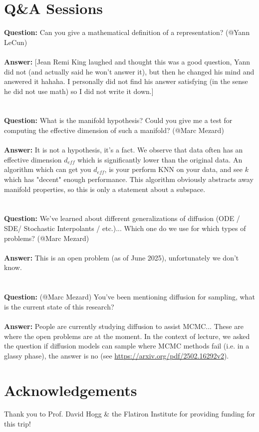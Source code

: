 \documentclass[12pt,fleqn]{book}
\numberwithin{equation}{section} %
\begin{document}
\section{Q\&A Sessions}
\textbf{Question:} Can you give a mathematical definition of a representation? (@Yann LeCun)
\\ \\ 
\textbf{Answer:} [Jean Remi King laughed and thought this was a good question, Yann did not (and actually said he won't answer it), but then he changed his mind and answered it hahaha. I personally did not find his answer satisfying (in the sense he did not use math) so I did not write it down.]
\\
\\
\\
\textbf{Question:} What is the manifold hypothesis? Could you give me a test for computing the effective dimension of such a manifold? (@Marc Mezard)
\\ \\
\textbf{Answer:} It is not a hypothesis, it's a fact. We observe that data often has an effective dimension $d_{eff}$ which is significantly lower than the original data. An algorithm which can get you $d_{eff}$, is your perform KNN on your data, and see $k$ which has "decent" enough performance. This algorithm obviously abstracts away manifold properties, so this is only a statement about a subspace. 
\\
\\
\\
\textbf{Question:} We've learned about different generalizations of diffusion (ODE / SDE/ Stochastic Interpolants / etc.)... Which one do we use for which types of problems? (@Marc Mezard)
\\ \\
\textbf{Answer:} This is an open problem (as of June 2025), unfortunately we don't know.
\\
\\
\\
\textbf{Question:} (@Marc Mezard) You've been mentioning diffusion for sampling, what is the current state of this research?
\\ \\ 
\textbf{Answer:} People are currently studying diffusion to assist MCMC... These are where the open problems are at the moment. In the context of lecture, we asked the question if diffusion models can sample where MCMC methods fail (i.e. in a glassy phase), the answer is no (see \url{https://arxiv.org/pdf/2502.16292v2}).
 
\section{Acknowledgements}
Thank you to Prof. David Hogg \& the Flatiron Institute for providing funding for this trip!
\end{document}
